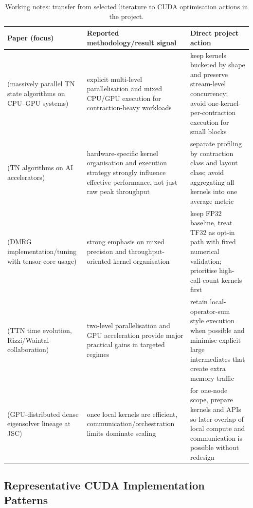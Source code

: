 \begin{table}[H]
\centering
\caption{Working notes: transfer from selected literature to CUDA optimisation actions in the project.}
\label{tab:paper-transfer-notes}
\begin{tabularx}{\textwidth}{X X X}
\toprule
Paper (focus) & Reported methodology/result signal & Direct project action \\
\midrule
\cite{menczer2025massive-jctc} (massively parallel TN state algorithms on CPU--GPU systems) &
explicit multi-level parallelisation and mixed CPU/GPU execution for contraction-heavy workloads &
keep kernels bucketed by shape and preserve stream-level concurrency; avoid one-kernel-per-contraction execution for small blocks \\
\cite{menczer2024ai-accelerators-jctc} (TN algorithms on AI accelerators) &
hardware-specific kernel organisation and execution strategy strongly influence effective performance, not just raw peak throughput &
separate profiling by contraction class and layout class; avoid aggregating all kernels into one average metric \\
\cite{menczer2024efficient-dmrg-gpu} (DMRG implementation/tuning with tensor-core usage) &
strong emphasis on mixed precision and throughput-oriented kernel organisation &
keep FP32 baseline, treat TF32 as opt-in path with fixed numerical validation; prioritise high-call-count kernels first \\
\cite{krinitsin2025ttn-ed} (TTN time evolution, Rizzi/Waintal collaboration) &
two-level parallelisation and GPU acceleration provide major practical gains in targeted regimes &
retain local-operator-sum style execution when possible and minimise explicit large intermediates that create extra memory traffic \\
\cite{wu2022chase-gpu,wu2023chase-nccl} (GPU-distributed dense eigensolver lineage at JSC) &
once local kernels are efficient, communication/orchestration limits dominate scaling &
for one-node scope, prepare kernels and APIs so later overlap of local compute and communication is possible without redesign \\
\bottomrule
\end{tabularx}
\end{table}

\subsection{Representative CUDA Implementation Patterns}\label{sec:sota-cuda-patterns}

